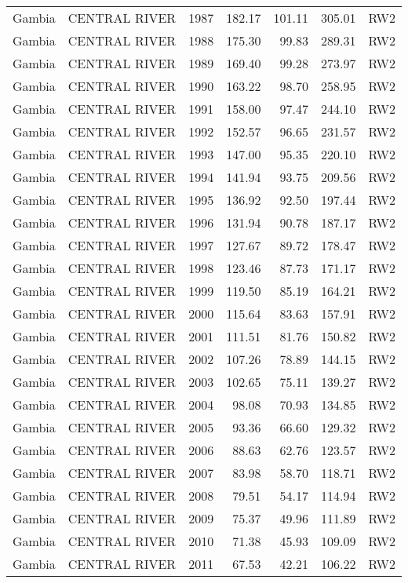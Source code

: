 \begin{longtable}{lllrrrl}
  Gambia & CENTRAL RIVER & 1987 & 182.17 & 101.11 & 305.01 & RW2 \\ 
  Gambia & CENTRAL RIVER & 1988 & 175.30 & 99.83 & 289.31 & RW2 \\ 
  Gambia & CENTRAL RIVER & 1989 & 169.40 & 99.28 & 273.97 & RW2 \\ 
  Gambia & CENTRAL RIVER & 1990 & 163.22 & 98.70 & 258.95 & RW2 \\ 
  Gambia & CENTRAL RIVER & 1991 & 158.00 & 97.47 & 244.10 & RW2 \\ 
  Gambia & CENTRAL RIVER & 1992 & 152.57 & 96.65 & 231.57 & RW2 \\ 
  Gambia & CENTRAL RIVER & 1993 & 147.00 & 95.35 & 220.10 & RW2 \\ 
  Gambia & CENTRAL RIVER & 1994 & 141.94 & 93.75 & 209.56 & RW2 \\ 
  Gambia & CENTRAL RIVER & 1995 & 136.92 & 92.50 & 197.44 & RW2 \\ 
  Gambia & CENTRAL RIVER & 1996 & 131.94 & 90.78 & 187.17 & RW2 \\ 
  Gambia & CENTRAL RIVER & 1997 & 127.67 & 89.72 & 178.47 & RW2 \\ 
  Gambia & CENTRAL RIVER & 1998 & 123.46 & 87.73 & 171.17 & RW2 \\ 
  Gambia & CENTRAL RIVER & 1999 & 119.50 & 85.19 & 164.21 & RW2 \\ 
  Gambia & CENTRAL RIVER & 2000 & 115.64 & 83.63 & 157.91 & RW2 \\ 
  Gambia & CENTRAL RIVER & 2001 & 111.51 & 81.76 & 150.82 & RW2 \\ 
  Gambia & CENTRAL RIVER & 2002 & 107.26 & 78.89 & 144.15 & RW2 \\ 
  Gambia & CENTRAL RIVER & 2003 & 102.65 & 75.11 & 139.27 & RW2 \\ 
  Gambia & CENTRAL RIVER & 2004 & 98.08 & 70.93 & 134.85 & RW2 \\ 
  Gambia & CENTRAL RIVER & 2005 & 93.36 & 66.60 & 129.32 & RW2 \\ 
  Gambia & CENTRAL RIVER & 2006 & 88.63 & 62.76 & 123.57 & RW2 \\ 
  Gambia & CENTRAL RIVER & 2007 & 83.98 & 58.70 & 118.71 & RW2 \\ 
  Gambia & CENTRAL RIVER & 2008 & 79.51 & 54.17 & 114.94 & RW2 \\ 
  Gambia & CENTRAL RIVER & 2009 & 75.37 & 49.96 & 111.89 & RW2 \\ 
  Gambia & CENTRAL RIVER & 2010 & 71.38 & 45.93 & 109.09 & RW2 \\ 
  Gambia & CENTRAL RIVER & 2011 & 67.53 & 42.21 & 106.22 & RW2 \\ 

\end{longtable}
